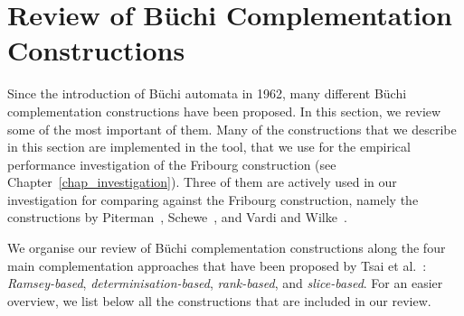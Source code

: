 

\section{Review of Büchi Complementation Constructions}
\label{2_review}
Since the introduction of Büchi automata in 1962, many different Büchi complementation constructions have been proposed. In this section, we review some of the most important of them. Many of the constructions that we describe in this section are implemented in the \goal{} tool, that we use for the empirical performance investigation of the Fribourg construction (see Chapter~\ref{chap_investigation}). Three of them are actively used in our investigation for comparing against the Fribourg construction, namely the constructions by Piterman~\cite{2006_piterman,2007_piterman}, Schewe~\cite{schewe2009buchi}, and Vardi and Wilke~\cite{vardi2007automata}.

We organise our review of Büchi complementation constructions along the four main complementation approaches that have been proposed by Tsai et al.~\cite{2011_tsai}: \textit{Ramsey-based}, \textit{determinisation-based}, \textit{rank-based}, and \textit{slice-based}. For an easier overview, we list below all the constructions that are included in our review.


